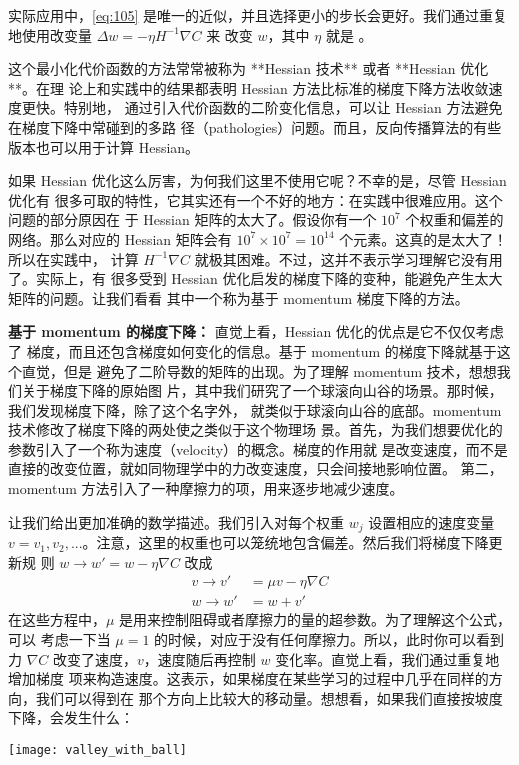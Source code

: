 实际应用中，\eqref{eq:105} 是唯一的近似，并且选择更小的步长会更好。我们通过重复
地使用改变量 $\Delta w = -\eta H^{-1} \nabla C$ 来 改变 $w$，其中 $\eta$ 就是
\learningrate{}。

这个最小化代价函数的方法常常被称为 **Hessian 技术** 或者 **Hessian 优化**。在理
论上和实践中的结果都表明 Hessian 方法比标准的梯度下降方法收敛速度更快。特别地，
通过引入代价函数的二阶变化信息，可以让 Hessian 方法避免在梯度下降中常碰到的多路
径（pathologies）问题。而且，反向传播算法的有些版本也可以用于计算 Hessian。

如果 Hessian 优化这么厉害，为何我们这里不使用它呢？不幸的是，尽管 Hessian 优化有
很多可取的特性，它其实还有一个不好的地方：在实践中很难应用。这个问题的部分原因在
于 Hessian 矩阵的太大了。假设你有一个 $10^7$ 个权重和偏差的网络。那么对应的
Hessian 矩阵会有 $10^7 \times 10^7=10^14$ 个元素。这真的是太大了！所以在实践中，
计算 $H^{-1}\nabla C$ 就极其困难。不过，这并不表示学习理解它没有用了。实际上，有
很多受到 Hessian 优化启发的梯度下降的变种，能避免产生太大矩阵的问题。让我们看看
其中一个称为基于 momentum 梯度下降的方法。

\textbf{基于 momentum 的梯度下降：} 直觉上看，Hessian 优化的优点是它不仅仅考虑了
梯度，而且还包含梯度如何变化的信息。基于 momentum 的梯度下降就基于这个直觉，但是
避免了二阶导数的矩阵的出现。为了理解 momentum 技术，想想我们关于梯度下降的原始图
片，其中我们研究了一个球滚向山谷的场景。那时候，我们发现梯度下降，除了这个名字外，
就类似于球滚向山谷的底部。momentum 技术修改了梯度下降的两处使之类似于这个物理场
景。首先，为我们想要优化的参数引入了一个称为速度（velocity）的概念。梯度的作用就
是改变速度，而不是直接的改变位置，就如同物理学中的力改变速度，只会间接地影响位置。
第二，momentum 方法引入了一种摩擦力的项，用来逐步地减少速度。

让我们给出更加准确的数学描述。我们引入对每个权重 $w_j$ 设置相应的速度变量
$v=v_1,v_2,...$。注意，这里的权重也可以笼统地包含偏差。然后我们将梯度下降更新规
则 $w\rightarrow w'=w-\eta\nabla C$ 改成
\begin{align} 
  v \rightarrow v' &= \mu v - \eta \nabla C \label{eq:107}\tag{107}\\
  w \rightarrow w' &= w+v' \label{eq:108}\tag{108}
\end{align}
在这些方程中，$\mu$ 是用来控制阻碍或者摩擦力的量的超参数。为了理解这个公式，可以
考虑一下当 $\mu=1$ 的时候，对应于没有任何摩擦力。所以，此时你可以看到力 $\nabla
C$ 改变了速度，$v$，速度随后再控制 $w$ 变化率。直觉上看，我们通过重复地增加梯度
项来构造速度。这表示，如果梯度在某些学习的过程中几乎在同样的方向，我们可以得到在
那个方向上比较大的移动量。想想看，如果我们直接按坡度下降，会发生什么：
\begin{center}
  \texttt{[image: valley\_with\_ball]}
\end{center}


